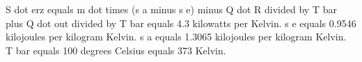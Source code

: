 S dot erz equals m dot times (s a minus s e) minus Q dot R divided by T bar plus Q dot out divided by T bar equals 4.3 kilowatts per Kelvin.  
s e equals 0.9546 kilojoules per kilogram Kelvin.  
s a equals 1.3065 kilojoules per kilogram Kelvin.  
T bar equals 100 degrees Celsius equals 373 Kelvin.
